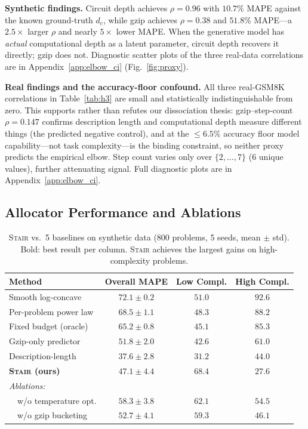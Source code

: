 \documentclass{article}
\newcommand{\method}{\textsc{Stair}}
\begin{document}
\textbf{Synthetic findings.}  Circuit depth achieves $\rho{=}0.96$ with $10.7\%$ MAPE against the known ground-truth $d_c$, while gzip achieves $\rho{=}0.38$ and $51.8\%$ MAPE---a $2.5\times$ larger $\rho$ and nearly $5\times$ lower MAPE.  When the generative model has \emph{actual} computational depth as a latent parameter, circuit depth recovers it directly; gzip does not.  Diagnostic scatter plots of the three real-data correlations are in Appendix~\ref{app:elbow_ci} (Fig.~\ref{fig:proxy}).

\textbf{Real findings and the accuracy-floor confound.}  All three real-GSM8K correlations in Table~\ref{tab:h3} are small and statistically indistinguishable from zero.  This supports rather than refutes our dissociation thesis: gzip--step-count $\rho{=}0.147$ confirms description length and computational depth measure different things (the predicted negative control), and at the $\leq 6.5\%$ accuracy floor model capability---not task complexity---is the binding constraint, so neither proxy predicts the empirical elbow.  Step count varies only over $\{2,\ldots,7\}$ (6 unique values), further attenuating signal.  Full diagnostic plots are in Appendix~\ref{app:elbow_ci}.

\subsection{Allocator Performance and Ablations}
\label{sec:allocator}

\begin{table}[t]
\centering
\caption{\method{} vs.\ 5 baselines on synthetic data (800 problems, 5 seeds, mean $\pm$ std).  Bold: best result per column.  \method{} achieves the largest gains on high-complexity problems.}
\label{tab:allocator}
\small
\begin{tabular}{lccc}
\toprule
\textbf{Method} & \textbf{Overall MAPE} & \textbf{Low Compl.} & \textbf{High Compl.} \\
\midrule
Smooth log-concave & $72.1 \pm 0.2$ & $51.0$ & $92.6$ \\
Per-problem power law & $68.5 \pm 1.1$ & $48.3$ & $88.2$ \\
Fixed budget (oracle) & $65.2 \pm 0.8$ & $45.1$ & $85.3$ \\
Gzip-only predictor & $51.8 \pm 2.0$ & $42.6$ & $61.0$ \\
Description-length & $37.6 \pm 2.8$ & $31.2$ & $44.0$ \\
\midrule
\textbf{\method{} (ours)} & $\bm{47.1 \pm 4.4}$ & $68.4$ & $\bm{27.6}$ \\
\midrule
\textit{Ablations:} \\
\ \ w/o temperature opt. & $58.3 \pm 3.8$ & $62.1$ & $54.5$ \\
\ \ w/o gzip bucketing & $52.7 \pm 4.1$ & $59.3$ & $46.1$ \\
\bottomrule
\end{tabular}
\end{table}
\end{document}
